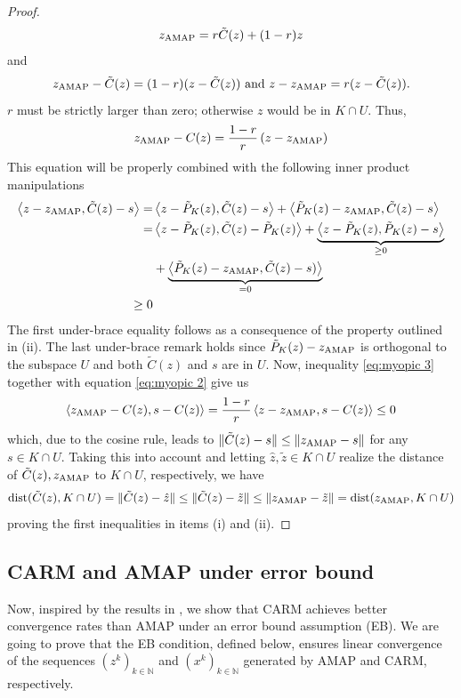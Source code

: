 \documentclass[smallextended,numbook,nospthms]{svjour3}
\theoremstyle{plain}
\theoremstyle{definition}
\def\NN{\mathds N}
\DeclareMathOperator{\dist}{dist}
\newcommand{\scal}[2]{\left\langle{#1},{#2}  \right\rangle}
\newcommand{\AMAP}{{\rm AMAP}}
\begin{document}
\begin{proof}
	\begin{equation}
		z_{\AMAP}=r\tilde{C}(z)+(1-r)z
	\end{equation}
	and
	\begin{equation}
		z_{\AMAP}-\tilde{C}(z)=(1-r)(z-\tilde{C}(z)) \text { and } z-z_{\AMAP}=r(z-\tilde{C}(z)).
	\end{equation}
	$r$ must be strictly larger than zero;  otherwise $z$ would be in $K \cap U$. Thus,
	\begin{equation}\label{eq:myopic 2}
		z_{\AMAP}-C(z)=\frac{1-r}{r}\left(z-z_{\AMAP}\right)
	\end{equation}
	This equation will be properly combined with the following inner product manipulations
	\begin{align}
		\scal{z-z_{\AMAP}}{\tilde{C}(z)-s}=&\scal{z-\tilde{P}_{K}(z)}{\tilde{C}(z)-s}+\scal{\tilde{P}_{K}(z)-z_{\AMAP}}{\tilde{C}(z)-s} \notag \\
		=&\scal{z-\tilde{P}_{K}(z)}{\tilde{C}(z)-\tilde{P}_{K}(z)}+\underbrace{\scal{z-\tilde{P}_{K}(z)}{\tilde{P}_{K}(z)-s}}_{\geq 0} \notag \\
		&+\underbrace{\scal{\tilde{P}_{K}(z)-z_{\AMAP}}{\tilde{C}(z)-s)}}_{=0}  \\
		\geq 0\label{eq:myopic 3}
	\end{align}
	The first under-brace equality follows as a consequence of the property outlined in (ii). The last under-brace remark holds since $\tilde{P}_{K}(z)-z_{\AMAP}$ is orthogonal to the subspace $U$ and both $\tilde{C}(z)$ and $s$ are in $U $. Now, inequality \cref{eq:myopic 3} together with equation \cref{eq:myopic 2} give us
	\begin{equation}
		\scal{z_{\AMAP}-C(z)}{s-C(z)}=\frac{1-r}{r}\scal{z-z_{\AMAP}}{s-C(z)} \leq 0
	\end{equation}
	which, due to the cosine rule, leads to $\|\tilde{C}(z)-s\| \leq\|z_{\AMAP}-s\|$ for any $s \in K \cap U$. Taking this into account and letting $\hat{z}, \tilde{z} \in K \cap U$ realize the distance of $\tilde{C}(z), z_{\AMAP}$ to $K \cap U$, respectively, we have
	\begin{equation}
		\dist(\tilde{C}(z), K \cap U)=\|\tilde{C}(z)-\hat{z}\| \leq\|\tilde{C}(z)-\tilde{z}\| \leq\|z_{\AMAP}-\tilde{z}\|=\dist(z _{\AMAP}, K \cap U)	
	\end{equation}
	proving the first inequalities in items (i) and (ii).
\end{proof}

\subsection{CARM and AMAP under error bound}\label{subsec:comp EB}
Now, inspired by the results in \cite{Arefidamghani:2020}, we show that CARM achieves better convergence rates than AMAP under an error bound assumption (EB). We are going to prove that the EB condition, defined below, ensures linear convergence of the sequences $\left(z^{k}\right)_{k \in \NN}$ and $\left(x^{k}\right)_{k \in \NN}$ generated by AMAP and CARM, respectively.
\end{document}

